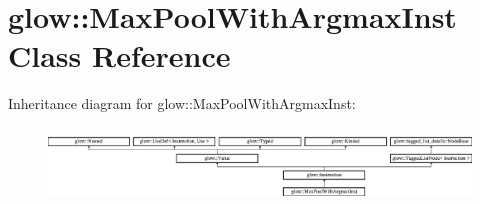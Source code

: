 \hypertarget{classglow_1_1_max_pool_with_argmax_inst}{}\section{glow\+:\+:Max\+Pool\+With\+Argmax\+Inst Class Reference}
\label{classglow_1_1_max_pool_with_argmax_inst}
Inheritance diagram for glow\+:\+:Max\+Pool\+With\+Argmax\+Inst\+:\begin{figure}[H]
\begin{center}
\leavevmode
\includegraphics[height=1.991111cm]{classglow_1_1_max_pool_with_argmax_inst}
\end{center}
\end{figure}
